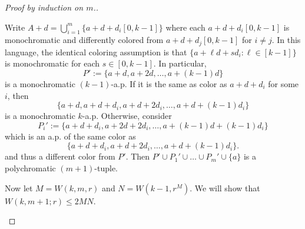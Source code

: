 \begin{proof}[Proof by induction on $m$.]
\begin{subproof}
 Write $A+d=\bigcup_{i=1}^m \{a+d+d_i[0,k-1]\}$ where each $a+d+d_i[0,k-1]$ is monochromatic and differently colored from $a+d+d_j[0,k-1]$ for $i\neq j$. In this language, the identical coloring assumption is that $\{ a+\ell d + s d_i: \ell \in [k-1] \}$ is monochromatic for each $s \in [0,k-1]$.
In particular, 
\[
 P':=\{a+d,a+2d,\dotsc,a+(k-1)d\}
 \] is a monochromatic $(k-1)$-a.p.  If it  is the same as color as $a+d+d_i$ for some $i$, then 
 \[
 \{ a+d, a+d+d_i,a+d+2d_i,\dotsc,a+d+(k-1)d_i\}
 \]
is a monochromatic $k$-a.p.
Otherwise,
%
% 
consider
\[
 P_i':=\{a+d+d_i,a+2d+2d_i,\dotsc,a+(k-1)d+(k-1)d_i\}
 \] which is an a.p. of the same color as 
 \[
 \{a+d+d_i,a+d+2d_i,\dotsc,a+d+(k-1)d_i\}.
 \]
and thus a different color from $P'$. Then $P'\cup P_1'\cup\dotsc\cup P_m'\cup\{a\}$ is a polychromatic $(m+1)$-tuple. \qedhere {}
\end{subproof}


Now let $M = W(k,m,r)$ and $N = W(k-1,r^M)$. We will show that $W(k,m+1;r)\leq 2MN$. 

\begin{figure*}
\begin{center}
\end{center}
\end{figure*}
\end{proof}
